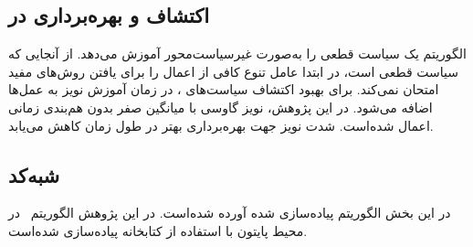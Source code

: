          \subsection{اکتشاف و بهره‌برداری در 
 }
 الگوریتم
  یک سیاست قطعی را به‌صورت غیرسیاست‌محور آموزش می‌دهد. از آنجایی که سیاست قطعی است،
در ابتدا عامل تنوع کافی از اعمال را برای یافتن روش‌های مفید امتحان نمی‌کند. برای بهبود اکتشاف سیاست‌های ،
در زمان آموزش
 نویز به عمل‌ها اضافه می‌شود. در این پژوهش، نویز گاوسی با میانگین صفر بدون هم‌بندی زمانی اعمال شده‌است.
 شدت نویز جهت بهره‌برداری بهتر در طول زمان کاهش می‌یابد.
  
  \subsection{شبه‌کد 
  }
   در این بخش الگوریتم
  پیاده‌سازی شده آورده شده‌است. در این پژوهش الگوریتم~ در محیط پایتون با استفاده از کتابخانه
   \cite{paszke2017automatic}
  پیاده‌سازی شده‌‌است.
         
